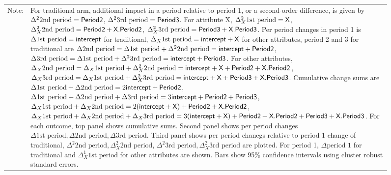 \begin{figure}
{\begin{tabular}{>{\hfill\scriptsize}p{1cm}<{}>{\scriptsize}p{12.5cm}<{\hfill}}
Note:& For \textsf{traditional} arm, additional impact in a period relative to period 1, or a second-order difference, is given by $\Delta^{2}\mbox{2nd period}=\mbox{\textsf{Period2}}$, $\Delta^{2}\mbox{3rd period}=\mbox{\textsf{Period3}}$. For attribute \textsf{X}, $\Delta^{2}_{X}\mbox{1st period}=\mbox{\textsf{X}}$, $\Delta^{2}_{X}\mbox{2nd period}=\mbox{\textsf{Period2}}+\mbox{\textsf{X.Period2}}$, $\Delta^{2}_{X}\mbox{3rd period}=\mbox{\textsf{Period3}}+\mbox{\textsf{X.Period3}}$. Per period changes in period 1 is $\Delta\mbox{1st period}=\mbox{\textsf{intercept}}$ for \textsf{traditional}, $\Delta_{X}\mbox{1st period}=\mbox{\textsf{intercept}}+\mbox{\textsf{X}}$ for other attributes, period 2 and 3 for \textsf{traditional} are $\Delta\mbox{2nd period}=\Delta\mbox{1st period}+\Delta^{2}\mbox{2nd period}=\mbox{\textsf{intercept}}+\mbox{\textsf{Period2}}$, $\Delta\mbox{3rd period}=\Delta\mbox{1st period}+\Delta^{2}\mbox{3rd period}=\mbox{\textsf{intercept}}+\mbox{\textsf{Period3}}$. For other attributes, $\Delta_{X}\mbox{2nd period}=\Delta_{X}\mbox{1st period}+\Delta^{2}_{X}\mbox{2nd period}=\mbox{\textsf{intercept}}+\mbox{\textsf{X}}+\mbox{\textsf{Period2}}+\mbox{\textsf{X.Period2}}$, $\Delta_{X}\mbox{3rd period}=\Delta_{X}\mbox{1st period}+\Delta^{2}_{X}\mbox{3rd period}=\mbox{\textsf{intercept}}+\mbox{\textsf{X}}+\mbox{\textsf{Period3}}+\mbox{\textsf{X.Period3}}$. Cumulative change sums are $\Delta\mbox{1st period}+\Delta\mbox{2nd period}=2\mbox{\textsf{intercept}}+\mbox{\textsf{Period2}}$, $\Delta\mbox{1st period}+\Delta\mbox{2nd period}+\Delta\mbox{3rd period}=3\mbox{\textsf{intercept}}+\mbox{\textsf{Period2}}+\mbox{\textsf{Period3}}$, $\Delta_{X}\mbox{1st period}+\Delta_{X}\mbox{2nd period}=2(\mbox{\textsf{intercept}}+\mbox{\textsf{X}})+\mbox{\textsf{Period2}}+\mbox{\textsf{X.Period2}}$, $\Delta_{X}\mbox{1st period}+\Delta_{X}\mbox{2nd period}+\Delta_{X}\mbox{3rd period}=3(\mbox{\textsf{intercept}}+\mbox{\textsf{X}})+\mbox{\textsf{Period2}}+\mbox{\textsf{X.Period2}}+\mbox{\textsf{Period3}}+\mbox{\textsf{X.Period3}}$. For each outcome, top panel shows cumulative sums.  Second panel shows per period changes $\Delta\mbox{1st period}, \Delta\mbox{2nd period}, \Delta\mbox{3rd period}$.   Third panel shows per period chanegs relative to period 1 change of \textsf{traditional}, $\Delta^{2}\mbox{2nd period}, \Delta^{2}_{X}\mbox{2nd period}$, $\Delta^{2}\mbox{3rd period}, \Delta^{2}_{X}\mbox{3rd period}$ are plotted. For period 1, $\Delta\mbox{period 1}$ for \textsf{traditional} and $\Delta^{1}_{X}\mbox{1st period}$ for other attributes are shown. Bars show 95\% confidence intervals using cluster robust standard errors.\\[1ex]
\end{tabular}
}
\end{figure}

